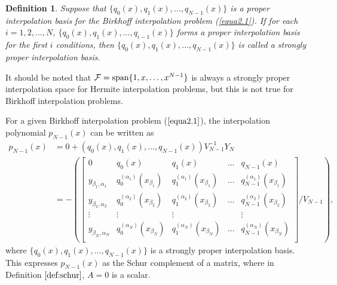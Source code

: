 \documentclass[preprint,12pt]{elsarticle}
\newtheorem{definition}{Definition}%
\begin{document}
\begin{definition}\label{def:8}
Suppose that %
$\{q_0(x), q_1(x),\dots,q_{N-1}(x)\}$ is a proper interpolation basis for the Birkhoff interpolation problem (\ref{equa2.1}).  If for each $i=1,2,\dots,N$, $\{q_0(x), q_1(x),\dots,q_{i-1}(x)\}$ forms a proper interpolation basis for the first $i$ conditions, then  $\{q_0(x), q_1(x),\dots,q_{N-1}(x)\}$ is called a strongly proper interpolation basis.
\end{definition}
It should be noted that $\mathcal{F}=\textup{span}\{1,x,\dots,x^{N-1}\} $ is always a strongly proper  interpolation space for Hermite interpolation problems, but this is  not  true for Birkhoff interpolation problems.

For a given Birkhoff interpolation problem  ($\ref{equa2.1}$), 
the interpolation polynomial $p_{N-1}(x)$ can be written as 
\begin{align*}
p_{N-1}(x)&=0+(q_0(x),q_1(x),\dots,q_{N-1}(x))V_{N-1}^{-1}Y_N \\
&=-\left(\left[
              \begin{array}{c|cccc}
                0 & q_0(x) & q_1(x) & \dots & q_{N-1}(x) \\ \hline
                y_{\beta_1, \alpha_1} & q_0^{(\alpha_1)}(x_{\beta_1}) & q_1^{(\alpha_1)}(x_{\beta_1}) & \dots & q_{N-1}^{(\alpha_1)}(x_{\beta_1}) \\
                y_{\beta_2, \alpha_2} & q_0^{(\alpha_2)}(x_{\beta_2}) & q_1^{(\alpha_2)}(x_{\beta_2}) & \dots & q_{N-1}^{(\alpha_2)}(x_{\beta_2}) \\
                \vdots & \vdots & \vdots & ~ & \vdots \\
                y_{\beta_N, \alpha_N} & q_0^{(\alpha_N)}(x_{\beta_N}) & q_1^{(\alpha_N)}(x_{\beta_N}) & \dots & q_{N-1}^{(\alpha_N)}(x_{\beta_N}) \\
              \end{array}
           \right]/V_{N-1} \right),
\end{align*}
where $\{q_0(x),q_1(x),\dots,q_{N-1}(x) \}$ is a strongly proper interpolation basis. This expresses $p_{N-1}(x)$
as the Schur complement of a matrix, where in Definition $\ref{def:schur}$, $A=0$ is a scalar.
\end{document}

